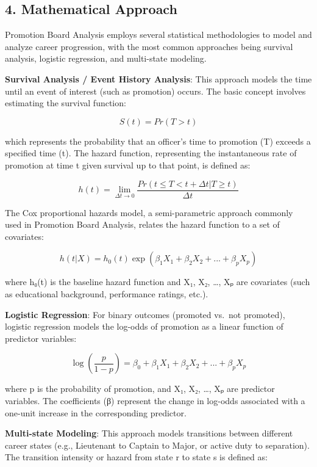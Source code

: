 \documentclass[
  letterpaper,
  DIV=11,
  numbers=noendperiod]{scrartcl}
\begin{document}
\subsection{4. Mathematical Approach}\label{mathematical-approach}

Promotion Board Analysis employs several statistical methodologies to
model and analyze career progression, with the most common approaches
being survival analysis, logistic regression, and multi-state modeling.

\textbf{Survival Analysis / Event History Analysis}: This approach
models the time until an event of interest (such as promotion) occurs.
The basic concept involves estimating the survival function:

\[ S(t) = Pr(T > t) \]

which represents the probability that an officer's time to promotion (T)
exceeds a specified time (t). The hazard function, representing the
instantaneous rate of promotion at time t given survival up to that
point, is defined as:

\[ h(t) = \lim_{\Delta t \to 0} \frac{Pr(t \leq T < t + \Delta t | T \geq t)}{\Delta t} \]

The Cox proportional hazards model, a semi-parametric approach commonly
used in Promotion Board Analysis, relates the hazard function to a set
of covariates:

\[ h(t|X) = h_0(t) \exp(\beta_1 X_1 + \beta_2 X_2 + ... + \beta_p X_p) \]

where h₀(t) is the baseline hazard function and X₁, X₂, \ldots, Xₚ are
covariates (such as educational background, performance ratings, etc.).

\textbf{Logistic Regression}: For binary outcomes (promoted vs.~not
promoted), logistic regression models the log-odds of promotion as a
linear function of predictor variables:

\[ \log\left(\frac{p}{1-p}\right) = \beta_0 + \beta_1 X_1 + \beta_2 X_2 + ... + \beta_p X_p \]

where p is the probability of promotion, and X₁, X₂, \ldots, Xₚ are
predictor variables. The coefficients (β) represent the change in
log-odds associated with a one-unit increase in the corresponding
predictor.

\textbf{Multi-state Modeling}: This approach models transitions between
different career states (e.g., Lieutenant to Captain to Major, or active
duty to separation). The transition intensity or hazard from state r to
state s is defined as:
\end{document}

